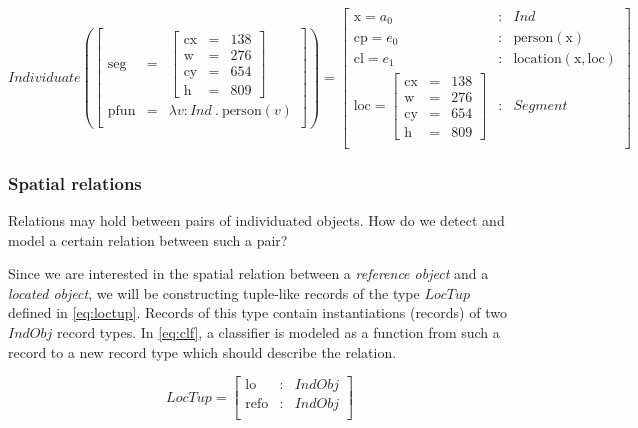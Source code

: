 \begin{equation}\label{eq:indfunrec}
Individuate(
\left[\begin{array}{rcl}
\text{seg} &=& \left[\begin{array}{rcl}
\text{cx} &=& 138\\
\text{w} &=& 276\\
\text{cy} &=& 654\\
\text{h} &=& 809
\end{array}\right]\\
\text{pfun} &=& \lambda v:Ind\ .\ \text{person}(v)\\
\end{array}\right]
) =
\left[\begin{array}{lcl}
    \text{x} = a_0 &:& Ind \\
    \text{cp} = e_0 &:& \text{person}(\text{x}) \\
    \text{cl} = e_1 &:& \text{location}(\text{x}, \text{loc}) \\
    \text{loc} = \left[\begin{array}{rcl}
\text{cx} &=& 138\\
\text{w} &=& 276\\
\text{cy} &=& 654\\
\text{h} &=& 809
\end{array}\right] &:& Segment\\
\end{array}\right]
\end{equation}



\subsubsection{Spatial relations}

Relations may hold between pairs of individuated objects.
How do we detect and model a certain relation between such a pair?

Since we are interested in the spatial relation between a \textit{reference object} and a \textit{located object}, we will be constructing tuple-like records of the type $LocTup$ defined in \autoref{eq:loctup}.
Records of this type contain instantiations (records) of two $IndObj$ record types.
In \autoref{eq:clf}, a classifier is modeled as a function from such a record to a new record type which should describe the relation.

\begin{equation}\label{eq:loctup}
LocTup = \left[\begin{array}{rcl}
    \text{lo} &:& IndObj \\
    \text{refo} &:& IndObj \\
    \end{array}\right]
\end{equation}

